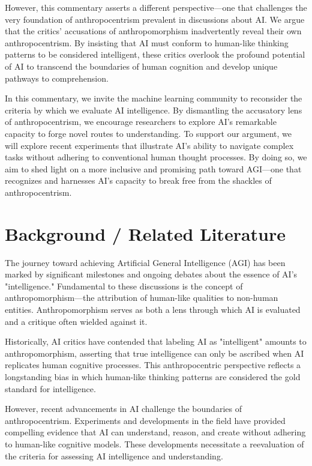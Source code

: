 \documentclass{article}
\begin{document}
However, this commentary asserts a different perspective—one that challenges the very foundation of anthropocentrism prevalent in discussions about AI. 
We argue that the critics' accusations of anthropomorphism inadvertently reveal their own anthropocentrism. 
By insisting that AI must conform to human-like thinking patterns to be considered intelligent, these critics overlook the profound potential of AI to transcend the boundaries of human cognition and develop unique pathways to comprehension.\par

In this commentary, we invite the machine learning community to reconsider the criteria by which we evaluate AI intelligence. 
By dismantling the accusatory lens of anthropocentrism, we encourage researchers to explore AI's remarkable capacity to forge novel routes to understanding. 
To support our argument, we will explore recent experiments that illustrate AI's ability to navigate complex tasks without adhering to conventional human thought processes. 
By doing so, we aim to shed light on a more inclusive and promising path toward AGI—one that recognizes and harnesses AI's capacity to break free from the shackles of anthropocentrism.\par

\section{Background / Related Literature}

The journey toward achieving Artificial General Intelligence (AGI) has been marked by significant milestones and ongoing debates about the essence of AI's "intelligence." 
Fundamental to these discussions is the concept of anthropomorphism—the attribution of human-like qualities to non-human entities. 
Anthropomorphism serves as both a lens through which AI is evaluated and a critique often wielded against it.\par

Historically, AI critics have contended that labeling AI as "intelligent" amounts to anthropomorphism, asserting that true intelligence can only be ascribed when AI replicates human cognitive processes. 
This anthropocentric perspective reflects a longstanding bias in which human-like thinking patterns are considered the gold standard for intelligence.\par

However, recent advancements in AI challenge the boundaries of anthropocentrism. 
Experiments and developments in the field have provided compelling evidence that AI can understand, reason, and create without adhering to human-like cognitive models. 
These developments necessitate a reevaluation of the criteria for assessing AI intelligence and understanding.\par
\end{document}

